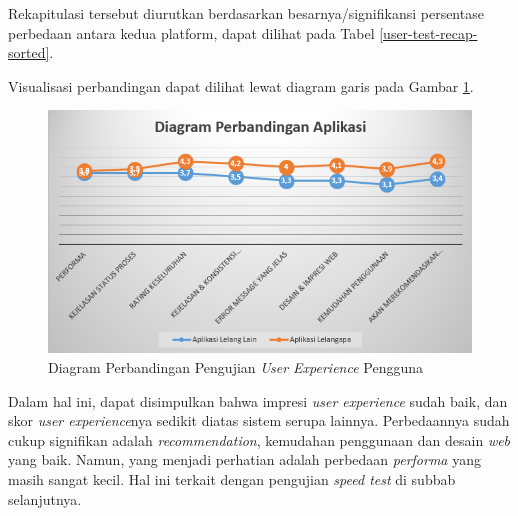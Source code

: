 \indent Rekapitulasi tersebut diurutkan berdasarkan besarnya/signifikansi persentase perbedaan antara kedua platform, dapat dilihat pada Tabel \ref{user-test-recap-sorted}.

Visualisasi perbandingan dapat dilihat lewat diagram garis pada Gambar \ref{diagram-pengguna-chart}.

\begin{figure}[H]
	\centering
	\includegraphics[width=\textwidth]{images/bab5/ujipengguna/chart.png}
	\caption{Diagram Perbandingan Pengujian \textit{User Experience} Pengguna}
	\label{diagram-pengguna-chart}
\end{figure}

\newpage
Dalam hal ini, dapat disimpulkan bahwa impresi \textit{user experience} sudah baik, dan skor \textit{user experience}nya sedikit diatas sistem serupa lainnya. Perbedaannya sudah cukup signifikan adalah \textit{recommendation}, kemudahan penggunaan dan desain \textit{web} yang baik. Namun, yang menjadi perhatian adalah perbedaan \textit{performa} yang masih sangat kecil. Hal ini terkait dengan pengujian \textit{speed test} di subbab selanjutnya.